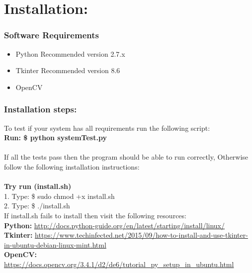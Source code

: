 \documentclass{article}
\begin{document}
\newpage
{}
\tableofcontents

\newpage
{}
\pagestyle{fancy}
\renewcommand{\headrulewidth}{0pt}

\section*{Installation:}
\subsubsection*{Software Requirements}
\begin{itemize}
\item Python Recommended version 2.7.x
\item Tkinter Recommended version 8.6
\item OpenCV

\end{itemize}
\subsubsection*{Installation steps:}
To test if your system has all requirements run the following script:\\
\textbf{Run: \$ python systemTest.py}\\
\\If all the tests pass then the program should be able to run correctly, Otherwise follow the following installation instructions:\\\\
\textbf{Try run (install.sh)}\\
1. Type: \$ sudo chmod +x install.sh\\
2. Type: \$ ./install.sh\\
If install.sh fails to install then visit the following resources:\\
\textbf{Python:} \url{http://docs.python-guide.org/en/latest/starting/install/linux/}\\
\textbf{Tkinter:} \url{https://www.techinfected.net/2015/09/how-to-install-and-use-tkinter-in-ubuntu-debian-linux-mint.html}\\
\textbf{OpenCV:} \url{https://docs.opencv.org/3.4.1/d2/de6/tutorial_py_setup_in_ubuntu.html}
\end{document}
